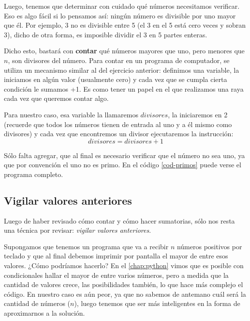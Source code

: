 Luego, tenemos que determinar con cuidado qué números necesitamos verificar. Eso es algo fácil si lo pensamos así: ningún número es divisible por uno mayor que él. Por ejemplo, 3 no es divisible entre 5 (el 3 en el 5 está cero veces y sobran 3), dicho de otra forma, es imposible dividir el 3 en 5 partes enteras.

Dicho esto, bastará con \textbf{contar} qué números mayores que uno, pero menores que $n$, son divisores del número. Para contar en un programa de computador, se utiliza un mecanismo similar al del ejercicio anterior: definimos una variable, la iniciamos en algún valor (usualmente cero) y cada vez que se cumpla cierta condición le sumamos +1. Es como tener un papel en el que realizamos una raya cada vez que queremos contar algo.

Para nuestro caso, esa variable la llamaremos $divisores$, la iniciaremos en 2 (recuerde que todos los números tienen de entrada al uno y a él mismo como divisores) y cada vez que encontremos un divisor ejecutaremos la instrucción:
\begin{equation}
divisores = divisores + 1
\end{equation}

Sólo falta agregar, que al final es necesario verificar que el número no sea uno, ya que por convención el uno no es primo. En el código \ref{cod-primos} puede verse el programa completo.  \\

\newpage

 



\subsection{Vigilar valores anteriores}

Luego de haber revisado cómo contar y cómo hacer sumatorias, sólo nos resta una técnica por revisar: \emph{vigilar valores anteriores}.

Supongamos que tenemos un programa que va a recibir $n$ números positivos por teclado y que al final debemos imprimir por pantalla el mayor de entre esos valores. ¿Cómo podríamos hacerlo? En el \autoref{chap:python} vimos que es posible con condicionales hallar el mayor de entre varios números, pero a medida que la cantidad de valores crece, las posibilidades también, lo que hace más complejo el código. En nuestro caso es aún peor, ya que no sabemos de antemano cuál será la cantidad de números ($n$), luego tenemos que ser más inteligentes en la forma de aproximarnos a la solución.

